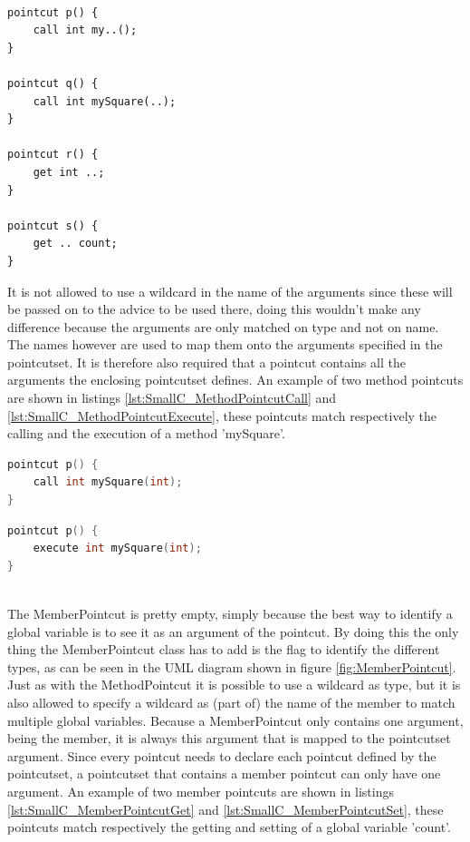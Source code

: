 \documentclass[a4paper]{report}
\begin{document}
\\
\begin{lstlisting}[multicols=2,caption=Some examples of pointcuts.,label=lst:SmallC_Wildcards]
pointcut p() {
	call int my..();
}

pointcut q() {
	call int mySquare(..);
}

pointcut r() {
	get int ..;
}

pointcut s() {
	get .. count;
}
\end{lstlisting}
It is not allowed to use a wildcard in the name of the arguments since these will be passed on to the advice to be used there, doing this wouldn't make any difference because the arguments are only matched on type and not on name. The names however are used to map them onto the arguments specified in the pointcutset. It is therefore also required that a pointcut contains all the arguments the enclosing pointcutset defines. An example of two method pointcuts are shown in listings \ref{lst:SmallC_MethodPointcutCall} and \ref{lst:SmallC_MethodPointcutExecute}, these pointcuts match respectively the calling and the execution of a method 'mySquare'.\\
\begin{minipage}{0.42\textwidth}
\begin{lstlisting}[language=C, caption=Example of a method call pointcut, label=lst:SmallC_MethodPointcutCall]
pointcut p() {
	call int mySquare(int);
}
\end{lstlisting}
\end{minipage}\hfill
\begin{minipage}{0.42\textwidth}
\begin{lstlisting}[language=C, caption=Example of a method execution pointcut, label=lst:SmallC_MethodPointcutExecute]
pointcut p() {
	execute int mySquare(int);
}
\end{lstlisting}
\end{minipage}
\\
The MemberPointcut is pretty empty, simply because the best way to identify a global variable is to see it as an argument of the pointcut. By doing this the only thing the MemberPointcut class has to add is the flag to identify the different types, as can be seen in the UML diagram shown in figure \ref{fig:MemberPointcut}. Just as with the MethodPointcut it is possible to use a wildcard as type, but it is also allowed to specify a wildcard as (part of) the name of the member to match multiple global variables. Because a MemberPointcut only contains one argument, being the member, it is always this argument that is mapped to the pointcutset argument. Since every pointcut needs to declare each pointcut defined by the pointcutset, a pointcutset that contains a member pointcut can only have one argument. An example of two member pointcuts are shown in listings \ref{lst:SmallC_MemberPointcutGet} and \ref{lst:SmallC_MemberPointcutSet}, these pointcuts match respectively the getting and setting of a global variable 'count'.\\
\end{document}
